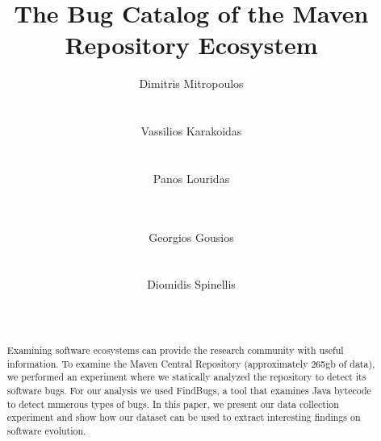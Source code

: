 \documentclass{sig-alternate}
\begin{document}
\title{The Bug Catalog of the Maven Repository Ecosystem}


\author{
\alignauthor
Dimitris Mitropoulos\\
       \\
       \\
\alignauthor Vassilios Karakoidas\\
       \\
       \\
\alignauthor Panos Louridas\\
       \\
       \\
\and  %
\alignauthor Georgios Gousios\\
       \\
       \\
\alignauthor Diomidis Spinellis\\
       \\
       \\
}

\maketitle
\begin{abstract}
Examining software ecosystems can provide the research community
with useful information. To examine the Maven Central Repository
(approximately 265{\sc gb} of data), we performed an experiment
where we statically analyzed the repository to detect its software
bugs. For our analysis we used FindBugs, a tool that
examines Java bytecode to detect numerous types of bugs.
In this paper, we present our data collection experiment
and show how our dataset can be used to extract interesting
findings on software evolution.
\end{abstract}
\end{document}
